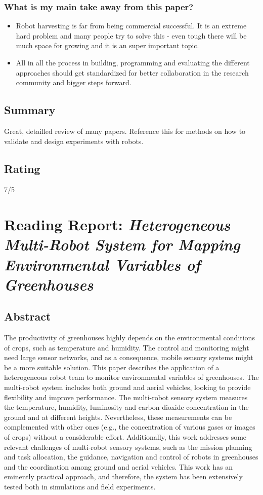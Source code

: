     \subsubsection*{What is my main take away from this paper?}
    \begin{itemize}
        \item Robot harvesting is far from being commercial successful. It is an extreme hard problem and many people try to solve this - even tough there will be much space for growing and it is an super important topic.
        \item All in all the process in building, programming and evaluating the different approaches should get standardized for better collaboration in the research community and bigger steps forward.
    \end{itemize}
    
    \subsection*{Summary}
    Great, detailled review of many papers. Reference this for methods on how to validate and design experiments with robots.
    \subsection*{Rating}
    7/5
    
    
    \newpage
    
    \section{Reading Report: \emph{Heterogeneous Multi-Robot System for Mapping Environmental Variables of Greenhouses}}
    \cite{Roldan2016}
    
    \subsection*{Abstract}
    The productivity of greenhouses highly depends on the environmental conditions of crops,
    such as temperature and humidity. The control and monitoring might need large sensor networks,
    and as a consequence, mobile sensory systems might be a more suitable solution. This paper describes
    the application of a heterogeneous robot team to monitor environmental variables of greenhouses.
    The multi-robot system includes both ground and aerial vehicles, looking to provide flexibility
    and improve performance. The multi-robot sensory system measures the temperature, humidity,
    luminosity and carbon dioxide concentration in the ground and at different heights. Nevertheless,
    these measurements can be complemented with other ones (e.g., the concentration of various
    gases or images of crops) without a considerable effort. Additionally, this work addresses some
    relevant challenges of multi-robot sensory systems, such as the mission planning and task allocation,
    the guidance, navigation and control of robots in greenhouses and the coordination among ground
    and aerial vehicles. This work has an eminently practical approach, and therefore, the system has
    been extensively tested both in simulations and field experiments.
    
